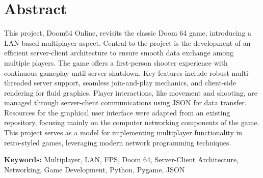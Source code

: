 \section*{Abstract}
This project, Doom64 Online, revisits the classic Doom 64 game, introducing a LAN-based multiplayer aspect. Central to the project is the development of an efficient server-client architecture to ensure smooth data exchange among multiple players. The game offers a first-person shooter experience with continuous gameplay until server shutdown. Key features include robust multi-threaded server support, seamless join-and-play mechanics, and client-side rendering for fluid graphics. Player interactions, like movement and shooting, are managed through server-client communications using JSON for data transfer. Resources for the graphical user interface were adapted from an existing repository, focusing mainly on the computer networking components of the game. This project serves as a model for implementing multiplayer functionality in retro-styled games, leveraging modern network programming techniques.
\vspace{.5cm}

\textbf{Keywords:} Multiplayer, LAN, FPS, Doom 64, Server-Client Architecture, Networking, Game Development, Python, Pygame, JSON
\newpage